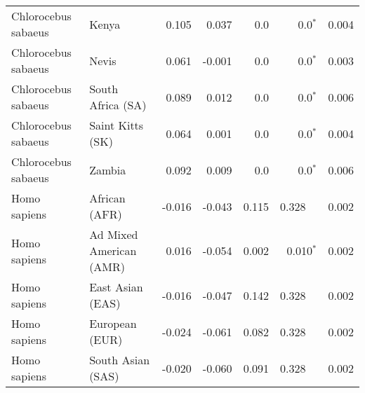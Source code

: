 \begin{center}
\begin{adjustbox}{width = 1\textwidth}
\begin{tabular}{|l|l|r|r|r|r|r|}
 Chlorocebus sabaeus &                           Kenya &                 0.105 &                                0.037 &                  0.0 &                             0.0$\bm{^*}$ &              0.004 \\
 Chlorocebus sabaeus &                           Nevis &                 0.061 &                               -0.001 &                  0.0 &                             0.0$\bm{^*}$ &              0.003 \\
 Chlorocebus sabaeus &               South Africa (SA) &                 0.089 &                                0.012 &                  0.0 &                             0.0$\bm{^*}$ &              0.006 \\
 Chlorocebus sabaeus &                Saint Kitts (SK) &                 0.064 &                                0.001 &                  0.0 &                             0.0$\bm{^*}$ &              0.004 \\
 Chlorocebus sabaeus &                          Zambia &                 0.092 &                                0.009 &                  0.0 &                             0.0$\bm{^*}$ &              0.006 \\
        Homo sapiens &                   African (AFR) &                -0.016 &                               -0.043 &                0.115 &                                  0.328~~ &              0.002 \\
        Homo sapiens &         Ad Mixed American (AMR) &                 0.016 &                               -0.054 &                0.002 &                           0.010$\bm{^*}$ &              0.002 \\
        Homo sapiens &                East Asian (EAS) &                -0.016 &                               -0.047 &                0.142 &                                  0.328~~ &              0.002 \\
        Homo sapiens &                  European (EUR) &                -0.024 &                               -0.061 &                0.082 &                                  0.328~~ &              0.002 \\
        Homo sapiens &               South Asian (SAS) &                -0.020 &                               -0.060 &                0.091 &                                  0.328~~ &              0.002 \\
\bottomrule
\end{tabular}
\end{adjustbox}
\end{center}
\newpage
